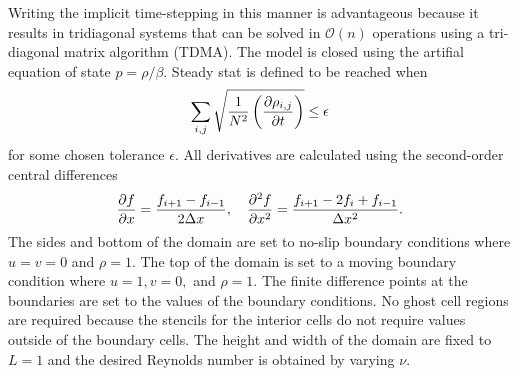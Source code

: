 \documentclass[reqno]{amsart}
\begin{document}
    Writing the implicit time-stepping in this manner is advantageous because it results in tridiagonal systems that can be solved in $\mathcal{O}(n)$ operations using a tri-diagonal matrix algorithm (TDMA).
    The model is closed using the artifial equation of state $p = \rho/\beta$.
    Steady stat is defined to be reached when
    \begin{equation*}
        \sum_{i,j}\sqrt{\frac{1}{N^2}\left(\pdiff[\rho_{i,j}]{t}\right)} \le \epsilon
    \end{equation*}
    for some chosen tolerance $\epsilon$.
    All derivatives are calculated using the second-order central differences
    \begin{equation*}
        \pdiff[f]{x} = \frac{f_{i+1} - f_{i-1}}{2\Delta x}, \quad
        \pdifftwo[f]{x} = \frac{f_{i+1} - 2f_i + f_{i-1}}{\Delta x^2}.
    \end{equation*}
    The sides and bottom of the domain are set to no-slip boundary conditions where $u = v = 0$ and $\rho = 1$.
    The top of the domain is set to a moving boundary condition where $u = 1, v = 0,$ and $\rho = 1$.
    The finite difference points at the boundaries are set to the values of the boundary conditions.
    No ghost cell regions are required because the stencils for the interior cells do not require values outside of the boundary cells.
    The height and width of the domain are fixed to $L = 1$ and the desired Reynolds number is obtained by varying $\nu$.
\end{document}
